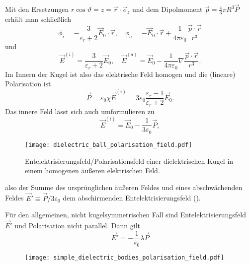 Mit den Ersetzungen $r\cos \vartheta =z=\vec {r}\cdot \vec {e}_{z}$ und dem Dipolmoment $\vec {p}=\frac{4}{3}\pi R^{3}\vec {P}$ erhält man schließlich
\begin{equation*}
	\phi _{i}=-\frac{3}{\varepsilon _{r}+2}\vec {E}_{0}\cdot \vec {r}, \quad\phi _{a}=-\vec {E}_{0}\cdot \vec {r}+\frac{1}{4\pi \varepsilon _{0}}\frac{\vec {p}\cdot \vec {r}}{r^{3}}
\end{equation*}
und
\begin{equation*}
	\vec {E}^{\left(i\right)}=\frac{3}{\varepsilon _{r}+2}\vec {E}_{0}, \quad\vec {E}^{\left(a\right)}=\vec {E}_{0}-\frac{1}{4\pi \varepsilon _{0}}\nabla \frac{\vec {p}\cdot \vec {r}}{r^{3}}.
\end{equation*}
Im Innern der Kugel ist also das elektrische Feld homogen und die (lineare) Polarisation ist
\begin{equation*}
	\vec {P}=\varepsilon _{0}\chi \vec {E}^{\left(i\right)}=3\varepsilon _{0}\frac{\varepsilon _{r}-1}{\varepsilon _{r}+2}\vec {E}_{0}.
\end{equation*}
Das innere Feld lässt sich auch umformulieren zu
\begin{equation*}
	\vec {E}^{\left(i\right)}=\vec {E}_{0}-\frac{1}{3\varepsilon _{0}}\vec {P},
\end{equation*}


\begin{figure}[htb]
	\centering
	\texttt{[image: dielectric\_ball\_polarisation\_field.pdf]}
	\caption{Entelektrisierungsfeld/Polarisationsfeld einer dielektrischen Kugel in einem homogenen äußeren elektrischen Feld. }
	\label{fig:dielectric_ball_polarisation_field}
\end{figure}

also der Summe des ursprünglichen äußeren Feldes und eines abschwächenden Feldes $\vec {E}'\equiv \vec {P}/3\varepsilon _{0}$ \textendash{} dem abschirmenden Entelektrisierungsfeld ().

Für den allgemeinen, nicht kugelsymmetrischen Fall sind Entelektrisierungsfeld $\vec {E}'$ und Polarisation nicht parallel. Dann gilt
\begin{equation*}
	\vec {E}'=-\frac{1}{\varepsilon _{0}}\lambda \vec {P}
\end{equation*}


\begin{figure}[htb]
	\centering
	\texttt{[image: simple\_dielectric\_bodies\_polarisation\_field.pdf]}
	\caption{}
	\label{fig:simple_dielectric_bodies_polarisation_field}
\end{figure}

